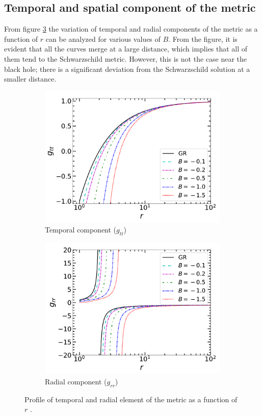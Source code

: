 \documentclass[12pt,a4paper,oneside]{book}
\begin{document}
\subsection{Temporal and spatial component of the metric}\label{Temp_rad_sec}
From figure \ref{temp_rad} the variation of temporal and radial components of the metric as a function of $r$ can be analyzed for various values of $B$. From the figure, it is evident that all the curves merge at a large distance, which implies that all of them tend to the Schwarzschild metric. However, this is not the case near the black hole; there is a significant deviation from the Schwarzschild solution at a smaller distance.
\begin{figure}[H]
	\begin{subfigure}[b]{0.5\textwidth}
         \centering
         \includegraphics[width=\textwidth]{temporal.pdf}
	\caption{Temporal component ($g_{tt}$)}
    		\label{temporal}
     \end{subfigure}
    \hfill
     \begin{subfigure}[b]{0.5\textwidth}
         \centering
         \includegraphics[width=\textwidth]{radial.pdf}
	\caption{Radial component ($g_{rr}$)}
    		\label{radial}
     \end{subfigure}
        \caption{Profile of temporal and radial element of the metric as a function of $r$ \cite{Kalita_Bani}.}
        \label{temp_rad}
\end{figure}
\end{document}
